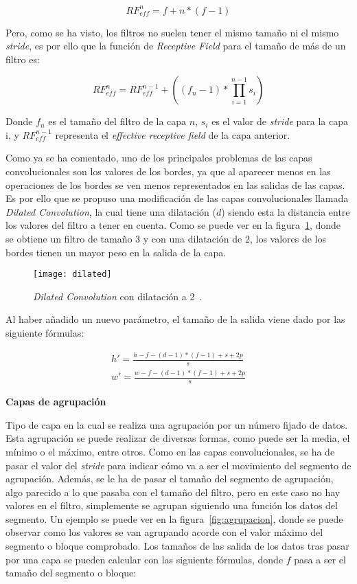 \begin{equation}
RF_{eff}^n = f + n*(f-1)
\end{equation}

Pero, como se ha visto, los filtros no suelen tener el mismo tamaño ni el mismo \textit{stride}, es por ello que la función de \textit{Receptive Field} para el tamaño de más de un filtro es:

\begin{equation}
RF_{eff}^n = RF_{eff}^{n-1} + ((f_n -1)* \prod_{i=1}^{n-1}s_i)
\end{equation}

Donde $f_n$ es el tamaño del filtro de la capa $n$, $s_i$ es el valor de \textit{stride} para la capa i, y $RF_{eff}^{n-1}$ representa el \textit{effective receptive field} de la capa anterior.

Como ya se ha comentado, uno de los principales problemas de las capas convolucionales son los valores de los bordes, ya que al aparecer menos en las operaciones de los bordes se ven menos representados en las salidas de las capas. Es por ello que se propuso una modificación de las capas convolucionales llamada \textit{Dilated Convolution}, la cual tiene una dilatación ($d$) siendo esta la distancia entre los valores del filtro a tener en cuenta. Como se puede ver en la figura~\ref{fig:dilated}, donde se obtiene un filtro de tamaño 3 y con una dilatación de 2, los valores de los bordes tienen un mayor peso en la salida de la capa.

\begin{figure}[h]
	\centering
	\texttt{[image: dilated]}
	\caption{\textit{Dilated Convolution} con dilatación a 2~\cite{cnn}.}
	\label{fig:dilated}
\end{figure}

Al haber añadido un nuevo parámetro, el tamaño de la salida viene dado por las siguiente fórmulas:

\begin{equation}
\begin{split}
h'=\frac{h-f-(d-1)*(f-1)+s+2p}{s}\\w'=\frac{w-f-(d-1)*(f-1)+s+2p}{s}
\end{split}
\end{equation}

\textbf{Capas de agrupación}

Tipo de capa en la cual se realiza una agrupación por un número fijado de datos. Esta agrupación se puede realizar de diversas formas, como puede ser la media, el mínimo o el máximo, entre otros. Como en las capas convolucionales, se ha de pasar el valor del \textit{stride} para indicar cómo va a ser el movimiento del segmento de agrupación. Además, se le ha de pasar el tamaño del segmento de agrupación, algo parecido a lo que pasaba con el tamaño del filtro, pero en este caso no hay valores en el filtro, simplemente se agrupan siguiendo una función los datos del segmento. Un ejemplo se puede ver en la figura~\ref{fig:agrupacion}, donde se puede observar como los valores se van agrupando acorde con el valor máximo del segmento o bloque comprobado. Los tamaños de las salida de los datos tras pasar por una capa se pueden calcular con las siguiente fórmulas, donde $f$ pasa a ser el tamaño del segmento o bloque:

